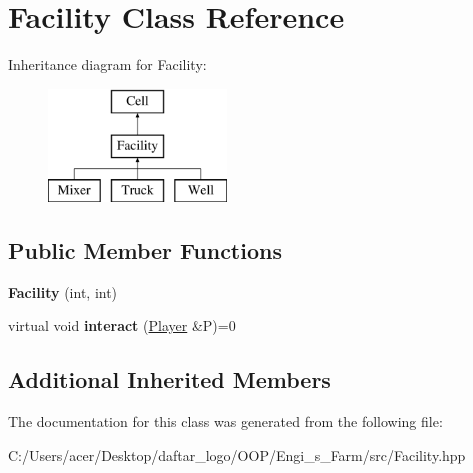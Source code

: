 \hypertarget{class_facility}{}\section{Facility Class Reference}
\label{class_facility}
Inheritance diagram for Facility\+:\begin{figure}[H]
\begin{center}
\leavevmode
\includegraphics[height=3.000000cm]{class_facility}
\end{center}
\end{figure}
\subsection*{Public Member Functions}
\begin{DoxyCompactItemize}
\item 
\mbox{\label{class_facility_ae47a8d0fbf22579e47136bed8d1b896c}} 
{\bfseries Facility} (int, int)
\item 
\mbox{\label{class_facility_af379e05c8bee2120210e7591545123f6}} 
virtual void {\bfseries interact} (\mbox{\hyperlink{class_player}{Player}} \&P)=0
\end{DoxyCompactItemize}
\subsection*{Additional Inherited Members}


The documentation for this class was generated from the following file\+:\begin{DoxyCompactItemize}
\item 
C\+:/\+Users/acer/\+Desktop/daftar\+\_\+logo/\+O\+O\+P/\+Engi\+\_\+s\+\_\+\+Farm/src/Facility.\+hpp\end{DoxyCompactItemize}
